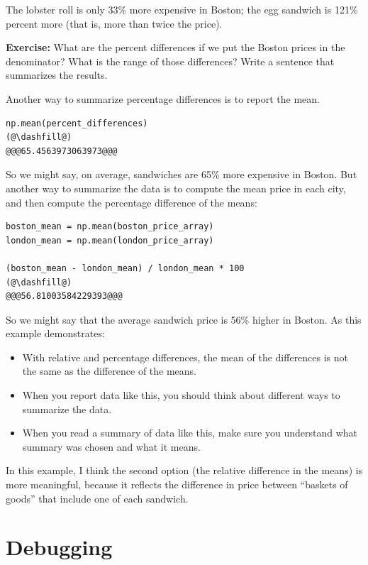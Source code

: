 The lobster roll is only 33\% more expensive in Boston; the egg sandwich
is 121\% percent more (that is, more than twice the price).

\textbf{Exercise:} What are the percent differences if we put the Boston
prices in the denominator? What is the range of those differences? Write
a sentence that summarizes the results.

Another way to summarize percentage differences is to report the mean.

\begin{lstlisting}[]
np.mean(percent_differences)
(@\dashfill@)
@@@65.4563973063973@@@
\end{lstlisting}

So we might say, on average, sandwiches are 65\% more expensive in
Boston. But another way to summarize the data is to compute the mean
price in each city, and then compute the percentage difference of the
means:

\begin{lstlisting}[]
boston_mean = np.mean(boston_price_array)
london_mean = np.mean(london_price_array)

(boston_mean - london_mean) / london_mean * 100
(@\dashfill@)
@@@56.81003584229393@@@
\end{lstlisting}

So we might say that the average sandwich price is 56\% higher in
Boston. As this example demonstrates:

\begin{itemize}
\item
  With relative and percentage differences, the mean of the differences
  is not the same as the difference of the means.
\item
  When you report data like this, you should think about different ways
  to summarize the data.
\item
  When you read a summary of data like this, make sure you understand
  what summary was chosen and what it means.
\end{itemize}

In this example, I think the second option (the relative difference in
the means) is more meaningful, because it reflects the difference in
price between ``baskets of goods'' that include one of each sandwich.

\hypertarget{debugging}{%
\section{Debugging}\label{debugging}}

